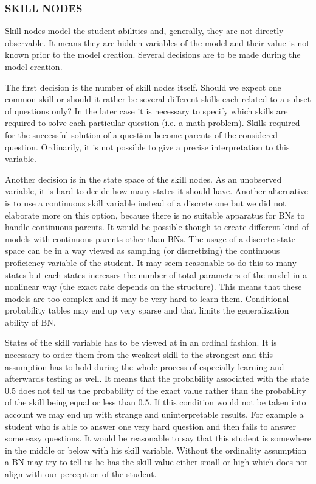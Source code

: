 \subsubsection{SKILL NODES}
Skill nodes model the student abilities and, generally, they are not directly observable. It means they are hidden variables of the model and their value is not known prior to the model creation. Several decisions are to be made during the model creation.
 
The first decision is the number of skill nodes itself. Should we expect one common skill or should it rather be several different skills each related to a subset of questions only? In the later case it is necessary to specify which skills are required to solve each particular question (i.e. a math problem). 
Skills required for the successful solution of a question become parents of the considered question.
Ordinarily, it is not possible to give a precise interpretation to this variable. 

Another decision is in the state space of the skill nodes. As an unobserved variable, it is hard to decide how many states it should have. Another alternative is to use a continuous skill variable instead of a discrete one but we did not elaborate more 
on this option, because there is no suitable apparatus for BNs to handle continuous parents. It would be possible though to create different kind of models with continuous parents other than BNs. The usage of a discrete state space can be in a way viewed as sampling (or discretizing) the continuous proficiency variable of the student. It may seem reasonable to do this to many states but each states increases the number of total parameters of the model in a nonlinear way (the exact rate depends on the structure). This means that these models are too complex and it may be very hard to learn them. Conditional probability tables may end up very sparse and that limits the generalization ability of BN. 

States of the skill variable has to be viewed at in an ordinal fashion. It is necessary to order them from the weakest skill to the strongest and this assumption has to hold during the whole process of especially learning and afterwards testing as well. It means that the probability associated with the state 0.5 does not tell us the probability of the exact value rather than the probability of the skill being equal or less than 0.5. If this condition would not be taken into account we may end up with strange and uninterpretable results. For example a student who is able to answer one very hard question and then fails to answer some easy questions. It would be reasonable to say that this student is somewhere in the middle or below with his skill variable. Without the ordinality assumption a BN may try to tell us he has the skill value either small or high which does not align with our perception of the student.

